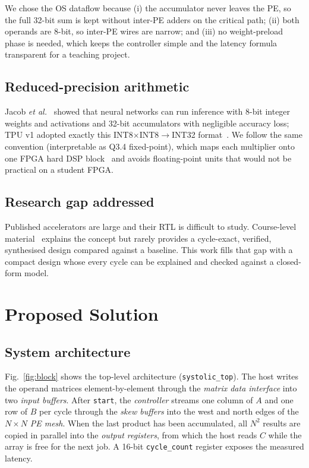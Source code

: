 \documentclass[conference]{IEEEtran}
\begin{document}
We chose the OS dataflow because (i) the accumulator never leaves the PE, so
the full 32-bit sum is kept without inter-PE adders on the critical path;
(ii) both operands are 8-bit, so inter-PE wires are narrow; and (iii) no
weight-preload phase is needed, which keeps the controller simple and the
latency formula transparent for a teaching project.

\subsection{Reduced-precision arithmetic}
Jacob \emph{et al.}~\cite{jacob2018quantization} showed that neural networks
can run inference with 8-bit integer weights and activations and 32-bit
accumulators with negligible accuracy loss; TPU v1 adopted exactly this
INT8$\times$INT8$\rightarrow$INT32 format~\cite{jouppi2017tpu}. We follow the
same convention (interpretable as Q3.4 fixed-point), which maps each multiplier
onto one FPGA hard DSP block~\cite{xilinx2018dsp48} and avoids floating-point
units that would not be practical on a student FPGA.

\subsection{Research gap addressed}
Published accelerators are large and their RTL is difficult to study.
Course-level material~\cite{patterson2020cod,hennessy2019ca} explains
the concept but rarely provides a cycle-exact, verified, synthesised design
compared against a baseline. This work fills that gap with a compact design
whose every cycle can be explained and checked against a closed-form model.

\section{Proposed Solution}

\subsection{System architecture}
Fig.~\ref{fig:block} shows the top-level architecture (\texttt{systolic\_top}).
The host writes the operand matrices element-by-element through the
\emph{matrix data interface} into two \emph{input buffers}. After
\texttt{start}, the \emph{controller} streams one column of $A$ and one row of
$B$ per cycle through the \emph{skew buffers} into the west and north edges of
the $N\times N$ \emph{PE mesh}. When the last product has been accumulated, all
$N^2$ results are copied in parallel into the \emph{output registers}, from
which the host reads $C$ while the array is free for the next job. A
16-bit \texttt{cycle\_count} register exposes the measured latency.
\end{document}
